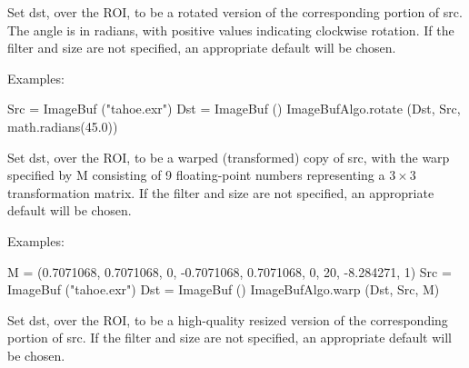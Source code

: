  

Set {\cf dst}, over the ROI, to be a rotated version of the
corresponding portion of {\cf src}.  The angle is in radians, with positive
values indicating clockwise rotation. If the filter and size are not
specified, an appropriate default will be chosen.

\smallskip
\noindent Examples:
\begin{code}
    Src = ImageBuf ("tahoe.exr")
    Dst = ImageBuf ()
    ImageBufAlgo.rotate (Dst, Src, math.radians(45.0))
\end{code}
\apiend


 

Set {\cf dst}, over the ROI, to be a warped (transformed) copy of {\cf src},
with the warp specified by {\cf M} consisting of 9 floating-point numbers
representing a $3 \times 3$ transformation matrix.  If the filter and size
are not specified, an appropriate default will be chosen.

\smallskip
\noindent Examples:
\begin{code}
    M = (0.7071068, 0.7071068, 0, -0.7071068, 0.7071068, 0, 20, -8.284271, 1)
    Src = ImageBuf ("tahoe.exr")
    Dst = ImageBuf ()
    ImageBufAlgo.warp (Dst, Src, M)
\end{code}
\apiend


 
Set {\cf dst}, over the ROI, to be a high-quality resized version of the
corresponding portion of {\cf src}.  If the filter and size are not
specified, an appropriate default will be chosen.

